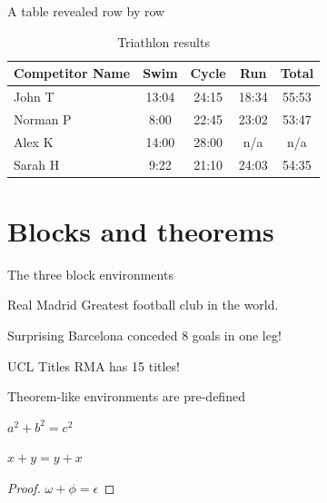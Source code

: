\documentclass[aspectratio=169,11pt]{beamer}
\begin{document}
\begin{frame}{A table revealed row by row}
    \begin{table}
    \begin{tabular}{l | c | c | c | c}
    Competitor Name & Swim & Cycle & Run & Total \\
    \hline \hline
    John T   & 13:04 & 24:15 & 18:34 & 55:53 \\
     Norman P & 8:00  & 22:45 & 23:02 & 53:47 \\
      Alex K   & 14:00 & 28:00 & n/a   & n/a   \\
      Sarah H  & 9:22  & 21:10 & 24:03 & 54:35
    \end{tabular}
    \caption{Triathlon results}
    \end{table}
\end{frame}


\section{Blocks and theorems}

\begin{frame}{The three block environments}
    \begin{block}{Real Madrid}
        Greatest football club in the world.
    \end{block}

    \begin{alertblock}{Surprising}
        Barcelona conceded 8 goals in one leg!
    \end{alertblock}

    \begin{exampleblock}{UCL Titles}
        RMA has 15 titles!
    \end{exampleblock}
\end{frame}

\begin{frame}{Theorem-like environments are pre-defined}
    \begin{theorem}[Pythagoras]
        $a^2 + b^2 = c^2$
    \end{theorem} \pause
    \begin{corollary}
        $x + y = y + x$
    \end{corollary} \pause
    \begin{proof}
        $\omega + \phi = \epsilon$
    \end{proof}
\end{frame}
\end{document}
